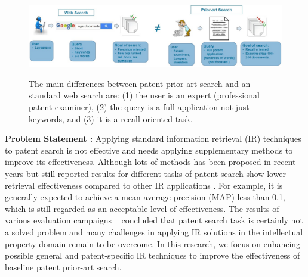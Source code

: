 \begin{figure}[htpb]
   \centering
   \includegraphics[width=\textwidth,height=35mm]{figs/webprior.jpg}
   \caption{The main differences between patent prior-art search and an standard web search are: (1) the user is an expert (professional patent examiner), (2) the query is a full application not just keywords, and (3) it is a recall oriented task.}  
   \label{fig:compareappr} 
\end{figure}
\FloatBarrier 
\noindent
\textbf{Problem Statement :}
Applying standard information retrieval (IR) techniques to patent search is not effective and needs applying supplementary methods to improve its effectiveness. Although lots of methods has been proposed in recent years but still reported results for different tasks of patent search show lower retrieval effectiveness compared to other IR applications \citep{lupu2013patent}. For example, it is generally expected to achieve a mean average precision (MAP) less than 0.1, which is still regarded as an acceptable level of effectiveness. The results of various evaluation campaigns ~\citep{lupu2013patent,joho2010survey, roda2010clef, DBLP:conf/clef/PiroiLHSMF12} concluded that patent search task is certainly not a solved problem and many challenges in applying IR solutions in the intellectual property domain remain to be overcome. In this research, we focus on enhancing possible general and patent-specific IR techniques to improve the effectiveness of baseline patent prior-art search. 
